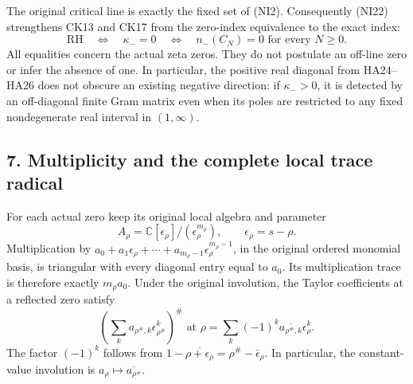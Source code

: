 \documentclass[
  10pt,
  a4paper,
]{article}
\begin{document}
The original critical line is exactly the fixed set of (NI2).
Consequently (NI22) strengthens CK13 and CK17 from the zero-index
equivalence to the exact index: \[
\mathrm{RH}\quad\Longleftrightarrow\quad\kappa_-=0
\quad\Longleftrightarrow\quad
n_-(C_N)=0\text{ for every }N\ge0.
\tag{NI24}
\] All equalities concern the actual zeta zeros. They do not postulate
an off-line zero or infer the absence of one. In particular, the
positive real diagonal from HA24--HA26 does not obscure an existing
negative direction: if \(\kappa_->0\), it is detected by an off-diagonal
finite Gram matrix even when its poles are restricted to any fixed
nondegenerate real interval in \((1,\infty)\).

\subsection{7. Multiplicity and the complete local trace
radical}\label{multiplicity-and-the-complete-local-trace-radical}

For each actual zero keep its original local algebra and parameter \[
A_\rho=\mathbb C[\epsilon_\rho]/(\epsilon_\rho^{m_\rho}),
\qquad \epsilon_\rho=s-\rho.
\tag{NI25}
\] Multiplication by
\(a_0+a_1\epsilon_\rho+\cdots+a_{m_\rho-1}\epsilon_\rho^{m_\rho-1}\), in
the original ordered monomial basis, is triangular with every diagonal
entry equal to \(a_0\). Its multiplication trace is therefore exactly
\(m_\rho a_0\). Under the original involution, the Taylor coefficients
at a reflected zero satisfy \[
\left(\sum_k a_{\rho^\#,k}\epsilon_{\rho^\#}^k\right)^\#
\text{ at }\rho
=\sum_k(-1)^k\overline{a_{\rho^\#,k}}\epsilon_\rho^k.
\tag{NI26}
\] The factor \((-1)^k\) follows from
\(1-\overline{\rho+\epsilon_\rho}=\rho^\#-\bar\epsilon_\rho\). In
particular, the constant-value involution is
\(a_\rho\mapsto\overline{a_{\rho^\#}}\).
\end{document}
